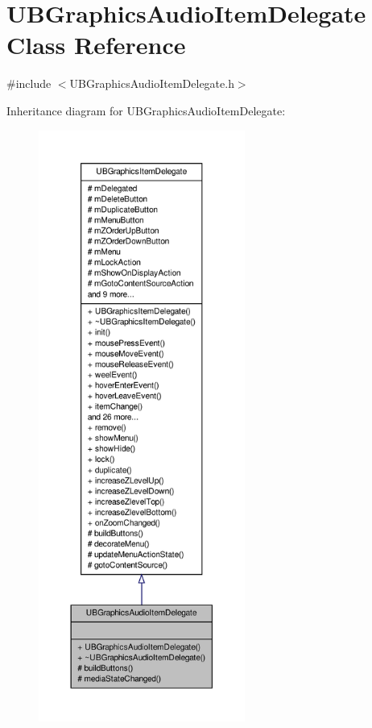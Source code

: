 \hypertarget{class_u_b_graphics_audio_item_delegate}{\section{U\-B\-Graphics\-Audio\-Item\-Delegate Class Reference}
\label{d0/da3/class_u_b_graphics_audio_item_delegate}
}


{\ttfamily \#include $<$U\-B\-Graphics\-Audio\-Item\-Delegate.\-h$>$}



Inheritance diagram for U\-B\-Graphics\-Audio\-Item\-Delegate\-:
\nopagebreak
\begin{figure}[H]
\begin{center}
\leavevmode
\includegraphics[height=550pt]{d7/d8f/class_u_b_graphics_audio_item_delegate__inherit__graph}
\end{center}
\end{figure}



